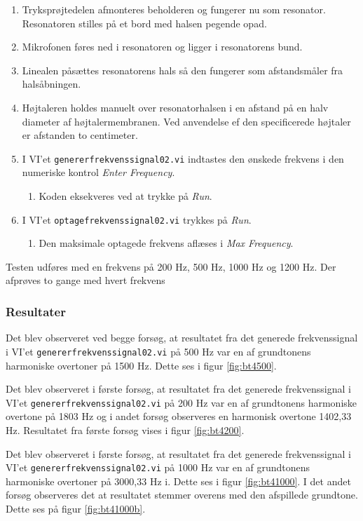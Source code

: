 			\begin{enumerate}
				\item Tryksprøjtedelen afmonteres beholderen og fungerer nu som resonator. Resonatoren stilles på et bord med halsen pegende opad. 
				\item Mikrofonen føres ned i resonatoren og ligger i resonatorens bund. 
				\item Linealen påsættes resonatorens hals så den fungerer som afstandsmåler fra halsåbningen.
				\item Højtaleren holdes manuelt over resonatorhalsen i en afstand på en halv diameter af højtalermembranen. Ved anvendelse ef den specificerede højtaler er afstanden to centimeter. 
				\item I VI'et \texttt{genererfrekvenssignal02.vi} indtastes den ønskede frekvens i den numeriske kontrol \textit{Enter Frequency}. 
					\begin{enumerate}
						\item Koden eksekveres ved at trykke på \textit{Run}. 
					\end{enumerate} 
				\item I VI'et \texttt{optagefrekvenssignal02.vi} trykkes på \textit{Run}. 
					\begin{enumerate}
						\item Den maksimale optagede frekvens aflæses i \textit{Max Frequency}. 
					\end{enumerate}	 	
			\end{enumerate}
			
			
			Testen udføres med en frekvens på 200 Hz, 500 Hz, 1000 Hz og 1200 Hz. Der afprøves to gange med hvert frekvens  
			
			\subsubsection{Resultater}
			Det blev observeret ved begge forsøg, at resultatet fra det generede frekvenssignal i VI'et \texttt{genererfrekvenssignal02.vi} på 500 Hz var en af grundtonens harmoniske overtoner på 1500 Hz. Dette ses i figur \ref{fig:bt4500}. 

			 Det blev observeret i første forsøg, at resultatet fra det generede frekvenssignal i VI'et \texttt{genererfrekvenssignal02.vi} på 200 Hz var en af grundtonens harmoniske overtone på 1803 Hz og i andet forsøg observeres en harmonisk overtone 1402,33 Hz. Resultatet fra første forsøg vises i figur \ref{fig:bt4200}.
			 
			 Det blev observeret i første forsøg, at resultatet fra det generede frekvenssignal i VI'et \texttt{genererfrekvenssignal02.vi} på 1000 Hz var en af grundtonens harmoniske overtoner på 3000,33 Hz i. Dette ses i figur \ref{fig:bt41000}. I det andet forsøg observeres det at resultatet stemmer overens med den afspillede grundtone. Dette ses på figur \ref{fig:bt41000b}.  
			 

